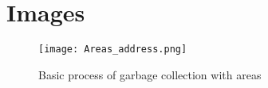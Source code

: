 \section{Images}

\begin{figure}[ht]
  \centering\texttt{[image: Areas\_address.png]}
  \caption{Basic process of garbage collection with areas}
  \label{fig:area_address}
\end{figure}
%


%
%
%
